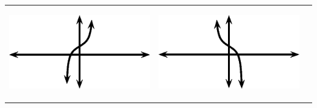 \begin{center}
\begin{xtabular*}{\mytablewidth}[t]{|p{10\mystarwidth}|p{10\mystarwidth}|p{10\mystarwidth}|}
                  
    \setcounter{subfigure}{0}

\label{m39414*id90981}
    \begin{center}
    \label{m39414*id90981!!!underscore!!!media}\label{m39414*id90981!!!underscore!!!printimage}\includegraphics{col11306.imgs/m39414_MG10C15_034.png} %
        
      \vspace{2pt}
    \vspace{.1in}
    
    \end{center}



    \addtocounter{footnote}{-0}
    
                 &
    
    
        
                  
    \setcounter{subfigure}{0}

\label{m39414*id90993}
    \begin{center}
    \label{m39414*id90993!!!underscore!!!media}\label{m39414*id90993!!!underscore!!!printimage}\includegraphics{col11306.imgs/m39414_MG10C15_035.png} %
        
      \vspace{2pt}
    \vspace{.1in}
    
    \end{center}




\end{xtabular*}
\end{center}
